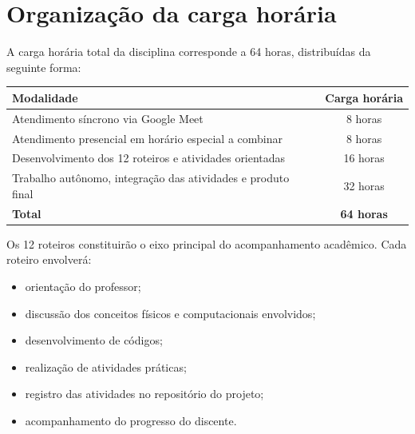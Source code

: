 \documentclass[11pt,a4paper]{article}
\begin{document}
\section{Organização da carga horária}
A carga horária total da disciplina corresponde a 64 horas, distribuídas da seguinte forma:

\vspace{0.5em}
\begin{center}
\begin{tabularx}{\textwidth}{X c}
\hline
\rowcolor{primary} \color{white}\textbf{Modalidade} & \color{white}\textbf{Carga horária} \\
\hline
Atendimento síncrono via Google Meet & 8 horas \\
Atendimento presencial em horário  especial a combinar & 8 horas \\
Desenvolvimento dos 12 roteiros e atividades orientadas & 16 horas \\
Trabalho autônomo, integração das atividades e produto final & 32 horas \\
\hline
\textbf{Total} & \textbf{64 horas} \\
\hline
\end{tabularx}
\end{center}
\vspace{0.5em}

Os 12 roteiros constituirão o eixo principal do acompanhamento acadêmico. Cada roteiro envolverá:
\begin{itemize}
    \item orientação do professor;
    \item discussão dos conceitos físicos e computacionais envolvidos;
    \item desenvolvimento de códigos;
    \item realização de atividades práticas;
    \item registro das atividades no repositório do projeto;
    \item acompanhamento do progresso do discente.
\end{itemize}
\end{document}
